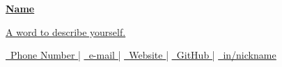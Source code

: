 

\begin{center}
    \textbf{\huge \underline{Name}}
\end{center}

\begin{center}
    \underline{A word to describe yourself.}
\end{center}

\begin{center}
    \href{tel:+886-}{
        \underline{
            \raisebox{0.0\height}{\footnotesize \faPhone}\
            {Phone Number}
        }
    } |
    \href{mailto:}{
        \underline{
            \raisebox{0.0\height}{\footnotesize \faEnvelope}\
            {e-mail}
        }
    } |
    \href{https://www.1chooo.com/}{
        \underline{
            \raisebox{0.0\height}{\footnotesize \faGlobe}\
            {Website}
        }
    } |
    \href{https://github.com/1chooo}{
        \underline{
            \raisebox{0.0\height}{\footnotesize \faGithub}\
            {GitHub}
        }
    } |
    \href{https://www.linkedin.com/in/1chooo/}{
        \underline{
            \raisebox{0.0\height}{\footnotesize \faLinkedin}\
            {in/nickname}
        }
    }
\end{center}

